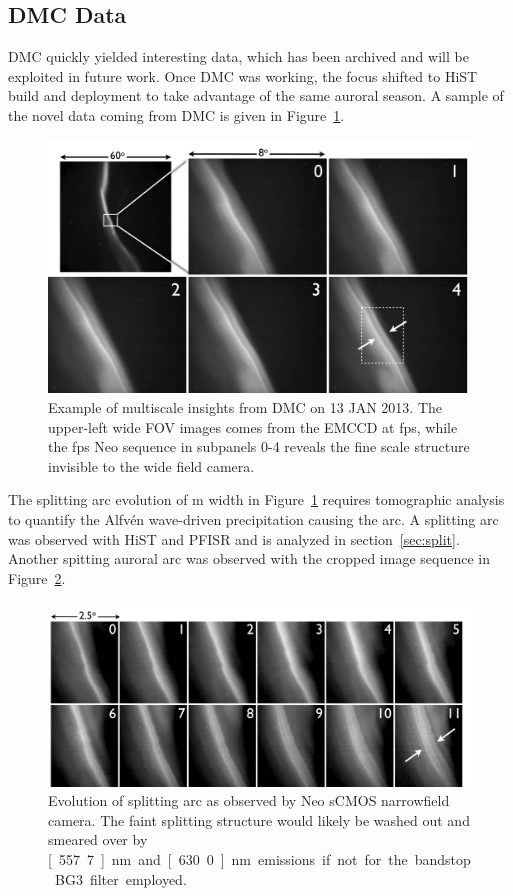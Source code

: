 \subsection{DMC Data}
DMC quickly yielded interesting data, which has been archived and will be exploited in future work.
Once DMC was working, the focus shifted to HiST build and deployment to take advantage of the same auroral season.
A sample of the novel data coming from DMC is given in Figure~\ref{fig:dmcsplit}.
\begin{figure}
	\includegraphics[width=\linewidth]{gfx/DMC_samples}
	\caption{Example of multiscale insights from DMC on 13 JAN 2013. The upper-left wide FOV images comes from the EMCCD at \unit[33]{fps}, while the \unit[50]{fps} Neo sequence in subpanels 0-4 reveals the fine scale structure invisible to the wide field camera.}
	\label{fig:dmcsplit}
\end{figure}
The splitting arc evolution of \unit[200]{m} width in Figure~\ref{fig:dmcsplit} requires tomographic analysis to quantify the Alfvén wave-driven precipitation causing the arc.
A splitting arc was observed with HiST and PFISR and is analyzed in section~\ref{sec:split}.
Another spitting auroral arc was observed with the cropped image sequence in Figure~\ref{fig:dmcsplit2}.
\begin{figure}
	\includegraphics[width=\linewidth]{gfx/packet}
	\caption{Evolution of splitting arc as observed by Neo sCMOS narrowfield camera. The faint splitting structure would likely be washed out and smeared over by \unit[557.7]{nm} and \unit[630.0]{nm} emissions if not for the bandstop BG3 filter employed.}
	\label{fig:dmcsplit2}
\end{figure}
